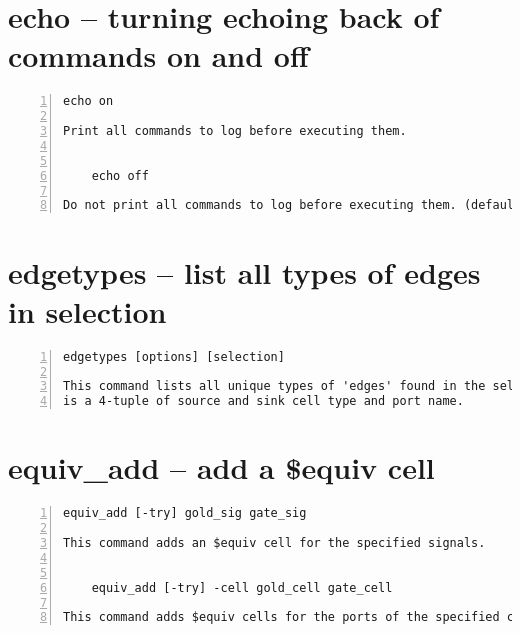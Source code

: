 \section{echo -- turning echoing back of commands on and off}
\label{cmd:echo}
\begin{lstlisting}[numbers=left,frame=single]
    echo on

Print all commands to log before executing them.


    echo off

Do not print all commands to log before executing them. (default)
\end{lstlisting}

\section{edgetypes -- list all types of edges in selection}
\label{cmd:edgetypes}
\begin{lstlisting}[numbers=left,frame=single]
    edgetypes [options] [selection]

This command lists all unique types of 'edges' found in the selection. An 'edge'
is a 4-tuple of source and sink cell type and port name.
\end{lstlisting}

\section{equiv\_add -- add a \$equiv cell}
\label{cmd:equiv_add}
\begin{lstlisting}[numbers=left,frame=single]
    equiv_add [-try] gold_sig gate_sig

This command adds an $equiv cell for the specified signals.


    equiv_add [-try] -cell gold_cell gate_cell

This command adds $equiv cells for the ports of the specified cells.
\end{lstlisting}

